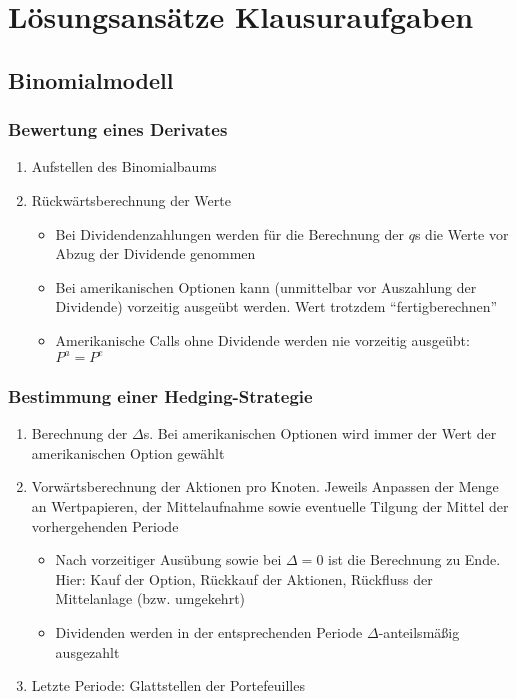 \section{Lösungsansätze Klausuraufgaben}

\subsection{Binomialmodell}

\subsubsection{Bewertung eines Derivates}
\begin{enumerate}
	\item Aufstellen des Binomialbaums
	\item Rückwärtsberechnung der Werte
	\begin{itemize}
		\item Bei Dividendenzahlungen werden für die Berechnung der \(q\)s die Werte vor Abzug der Dividende genommen
		\item Bei amerikanischen Optionen kann (unmittelbar vor Auszahlung der Dividende) vorzeitig ausgeübt werden. Wert trotzdem "`fertigberechnen"'
		\item Amerikanische Calls ohne Dividende werden nie vorzeitig ausgeübt: \(P^a=P^e\)
	\end{itemize}
\end{enumerate}

\subsubsection{Bestimmung einer Hedging-Strategie}
\begin{enumerate}
	\item Berechnung der \(\Delta\)s. Bei amerikanischen Optionen wird immer der Wert der amerikanischen Option gewählt
	\item Vorwärtsberechnung der Aktionen pro Knoten. Jeweils Anpassen der Menge an Wertpapieren, der Mittelaufnahme sowie eventuelle Tilgung der Mittel der vorhergehenden Periode
	\begin{itemize}
		\item Nach vorzeitiger Ausübung sowie bei \(\Delta=0\) ist die Berechnung zu Ende. Hier: Kauf der Option, Rückkauf der Aktionen, Rückfluss der Mittelanlage (bzw. umgekehrt)
		\item Dividenden werden in der entsprechenden Periode \(\Delta\)-anteilsmäßig ausgezahlt
	\end{itemize}
	\item Letzte Periode: Glattstellen der Portefeuilles
\end{enumerate}


